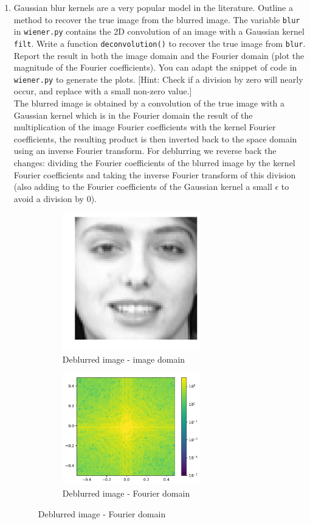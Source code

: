 \documentclass[12pt,twoside]{article}
\begin{document}
\begin{enumerate}
 \begin{enumerate}
 \item Gaussian blur kernels are a very popular model in the literature.  Outline a method to recover the true image from the blurred image. The variable \texttt{blur} in \texttt{wiener.py} contains the 2D convolution of an image with a Gaussian kernel \texttt{filt}. Write a function \texttt{deconvolution()} to recover the true image from \texttt{blur}. Report the result in both the image domain and the Fourier domain (plot the magnitude of the Fourier coefficients). You can adapt the snippet of code in \texttt{wiener.py} to generate the plots. [Hint: Check if a division by zero will nearly occur, and replace with a small non-zero value.]\\
 
 The blurred image is obtained by a convolution of the true image with a Gaussian kernel which is in the Fourier domain the result of the multiplication of the image Fourier coefficients with the kernel Fourier coefficients, the resulting product is then inverted back to the space domain using an inverse Fourier transform. For deblurring we reverse back the changes: dividing the Fourier coefficients of the blurred image by the kernel Fourier coefficients and taking the inverse Fourier transform of this division
 (also adding to the Fourier coefficients of the Gaussian kernel a small $\epsilon$ to avoid a division by $0$).
 
 \begin{figure}[H] 
\captionsetup[subfigure]{labelformat=empty}
\centering
   \begin{subfigure}[]{.5\textwidth}
   \centering
        \includegraphics[width=60mm]{code/wienerimages/DeBlurImage.pdf}
	\caption{Deblurred image - image domain}
    \end{subfigure}%
   \begin{subfigure}[]{.5\textwidth}
   \centering   
        \includegraphics[width=60mm]{code/wienerimages/DeBlurImageFFT.pdf}
        \caption{Deblurred image - Fourier domain}
    \end{subfigure}%
\end{figure}


\end{enumerate}
\end{enumerate}
\end{document}
